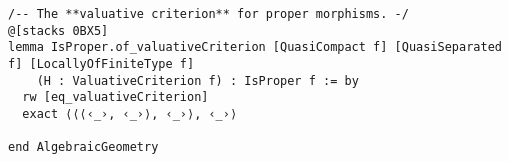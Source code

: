 \documentclass{article}
\begin{document}
\begin{lstlisting}[language=Lean, caption={ValuativeCriterion.lean}]
/-- The **valuative criterion** for proper morphisms. -/
@[stacks 0BX5]
lemma IsProper.of_valuativeCriterion [QuasiCompact f] [QuasiSeparated f] [LocallyOfFiniteType f]
    (H : ValuativeCriterion f) : IsProper f := by
  rw [eq_valuativeCriterion]
  exact ⟨⟨⟨‹_›, ‹_›⟩, ‹_›⟩, ‹_›⟩

end AlgebraicGeometry

\end{lstlisting}
\end{document}

